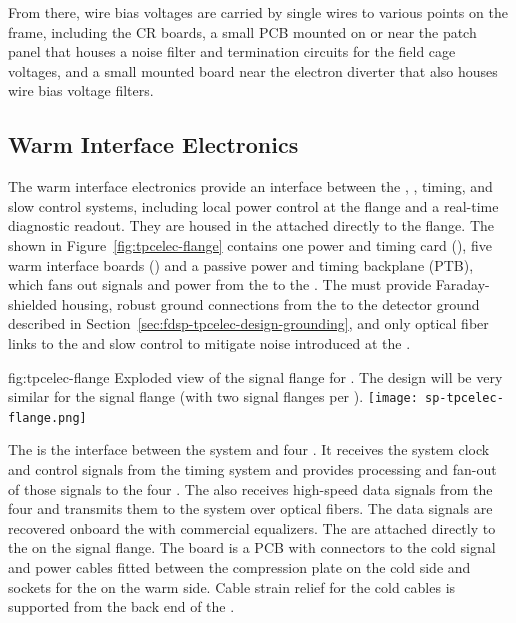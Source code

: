 From there, wire bias voltages are carried by single wires to 
various points on the  frame, including the CR boards, a small PCB mounted on or near 
the patch panel that houses a noise filter and termination circuits for the field cage voltages, and 
a small mounted board near the electron diverter that also houses wire bias voltage filters.

\subsection{Warm Interface Electronics}
\label{sec:fdsp-tpcelec-design-warm}

The warm interface electronics provide an interface between the , , timing, and slow control systems, including local power control at the flange and a real-time diagnostic readout. They are housed in the  attached directly to the  flange.  The  shown in Figure~\ref{fig:tpcelec-flange} contains one power and timing card (), five warm interface boards () and a passive power and timing backplane (PTB), which fans out signals and  power from the  to the . The  must provide Faraday-shielded housing, robust ground connections from the  to the detector ground described in Section~\ref{sec:fdsp-tpcelec-design-grounding}, and only optical fiber links to the  and slow control to mitigate noise introduced at the  \fdth.

\begin{dunefigure}
{fig:tpcelec-flange}
{Exploded view of the  signal flange for .  The design will be very similar for the   signal flange (with two  signal flanges per \fdth).}
\texttt{[image: sp-tpcelec-flange.png]}
\end{dunefigure}

The  is the interface between the  system and four
. It receives the system clock and control signals from the
timing system and provides processing and fan-out of those signals to the four
. The  also receives high-speed data signals from the four 
 and transmits them to the  system over optical
fibers. The data signals are recovered onboard the  with commercial equalizers.
The  are attached directly to the 
 \fdth on the signal flange. The \fdth
board is a PCB with connectors to the cold signal and  power cables fitted
between the compression plate on the cold side and sockets for
the  on the warm side. Cable strain relief for the cold cables is 
supported from the back end of the \fdth.

